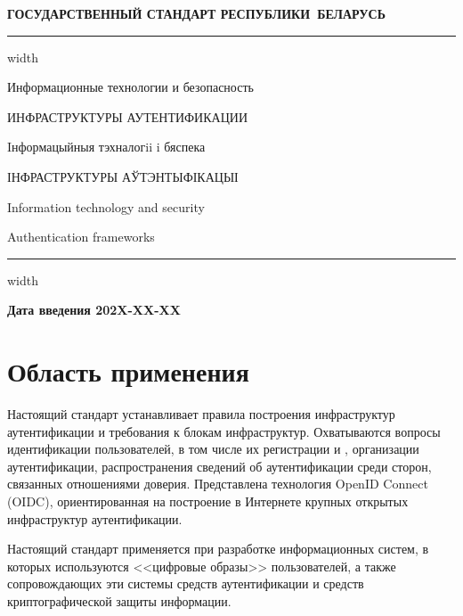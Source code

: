 \newpage
\setcounter{page}{1}
\pagestyle{headings}

\begin{center}
{\bfseries
ГОСУДАРСТВЕННЫЙ СТАНДАРТ РЕСПУБЛИКИ~БЕЛАРУСЬ
\vskip 2pt
\hrule width\textwidth

\vskip 9pt

Информационные технологии и безопасность

ИНФРАСТРУКТУРЫ АУТЕНТИФИКАЦИИ

\vskip 9pt

Iнформацыйныя тэхналогii i бяспека

ІНФРАСТРУКТУРЫ АЎТЭНТЫФІКАЦЫІ
}

\vskip 9pt

Information technology and security

Authentication frameworks

\vskip 4pt                
\hrule width \textwidth
\end{center}

\mbox{}\hfill{\bfseries Дата введения 202X-XX-XX}

\chapter{Область применения}\label{Scope}

Настоящий стандарт устанавливает правила построения инфраструктур 
аутентификации и требования к блокам инфраструктур. 
%        
Охватываются вопросы идентификации пользователей, 
в том числе их регистрации и , 
организации аутентификации, распространения сведений об
аутентификации среди сторон, связанных отношениями доверия. 
%
Представлена технология OpenID Connect (OIDC), ориентированная на построение
в Интернете крупных открытых инфраструктур аутентификации.

Настоящий стандарт применяется при разработке информационных систем,
в которых используются <<цифровые образы>> пользователей, а также 
сопровождающих эти системы средств аутентификации и средств криптографической 
защиты информации.

